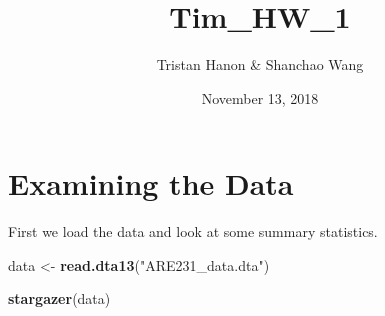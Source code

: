 \documentclass[]{article}
\title{Tim\_HW\_1}
\author{Tristan Hanon \& Shanchao Wang}
\date{November 13, 2018}
\newenvironment{Shaded}{\begin{snugshade}}{\end{snugshade}}
\newcommand{\KeywordTok}[1]{\textcolor[rgb]{0.13,0.29,0.53}{\textbf{#1}}}
\newcommand{\StringTok}[1]{\textcolor[rgb]{0.31,0.60,0.02}{#1}}
\newcommand{\NormalTok}[1]{#1}
\begin{document}
\maketitle

\section{Examining the Data}

First we load the data and look at some summary statistics.

\begin{Shaded}
\begin{Highlighting}[]
\NormalTok{data <-}\StringTok{ }\KeywordTok{read.dta13}\NormalTok{(}\StringTok{"ARE231_data.dta"}\NormalTok{)}

\KeywordTok{stargazer}\NormalTok{(data)}
\end{Highlighting}
\end{Shaded}
\end{document}
